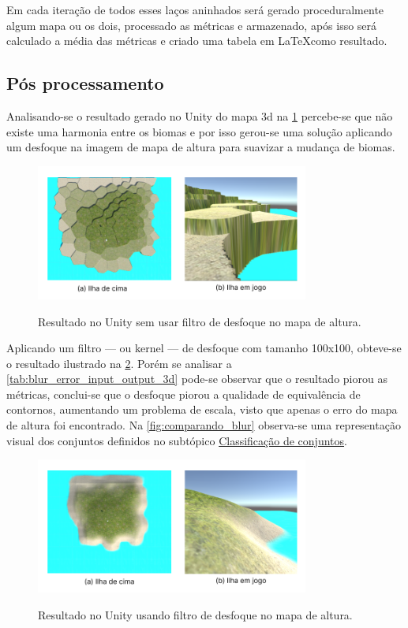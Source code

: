 Em cada iteração de todos esses laços aninhados será gerado proceduralmente algum mapa ou os dois, processado as métricas e armazenado, após isso será calculado a média das métricas e criado uma tabela em \LaTeX como resultado.

\subsection{Pós processamento}
Analisando-se o resultado gerado no Unity do mapa 3d na \cref{fig:Unity_init} percebe-se que não existe uma harmonia entre os biomas e por isso gerou-se uma solução aplicando um desfoque na imagem de mapa de altura para suavizar a mudança de biomas.

\begin{figure}[!ht]
	\centering
    \caption{Resultado no Unity sem usar filtro de desfoque no mapa de altura.}
	\includegraphics[width=0.8\textwidth]{figures/Unity_entry.png}
	\label{fig:Unity_init}
\end{figure}

Aplicando um filtro — ou kernel — de desfoque com tamanho 100x100, obteve-se o resultado ilustrado na \cref{fig:Unity_blur}. Porém se analisar a \cref{tab:blur_error_input_output_3d} pode-se observar que o resultado piorou as métricas, conclui-se que o desfoque piorou a qualidade de equivalência de contornos, aumentando um problema de escala, visto que apenas o erro do mapa de altura foi encontrado. Na \cref{fig:comparando_blur} observa-se uma representação visual dos conjuntos definidos no subtópico \hyperref[sec:classificacao_conjuntos]{Classificação de conjuntos}.

\begin{figure}[!ht]
	\centering
    \caption{Resultado no Unity usando filtro de desfoque no mapa de altura.}
	\includegraphics[width=0.8\textwidth]{figures/Unity_blur.png}
	\label{fig:Unity_blur}
\end{figure}

